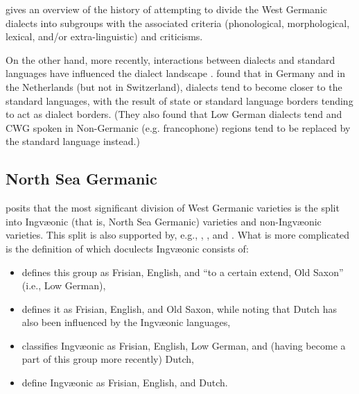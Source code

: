 \documentclass[a4paper]{article}
\begin{document}
\citet[pp. 72-80]{nielsen1989germanic} gives an overview of the history of attempting to divide the West Germanic dialects into subgroups with the associated criteria (phonological, morphological, lexical, and/or extra-linguistic) and criticisms.

On the other hand, more recently, %
interactions between dialects and standard languages
have influenced the dialect landscape
\citep{coetsem1992interaction}.
\citet{kremer1990einfuehrung} found that in Germany and in the Netherlands
(but not in Switzerland), dialects tend to become closer to the standard languages,
with the result of state or standard language borders tending to act as dialect borders.
(They also found that Low German dialects tend and CWG spoken in Non-Germanic (e.g. francophone) regions tend to be replaced by the standard language instead.)

\subsection{North Sea Germanic}

\citet{stiles2013pan-west} posits that
the most significant division of West Germanic varieties is
the split into Ingv\ae{}onic (that is, North Sea Germanic) varieties
and non-Ingv\ae{}onic varieties.
This split is also supported by, e.g., \citet[p. 7]{harbert2007germanic}, \citet[pp. 117--123]{sonderegger1979grundzuege}, and \cite{auwera2017germanic}.
What is more complicated is the definition of which doculects Ingv\ae{}onic consists of:
\begin{itemize}
\item 
\citet{stiles2013pan-west} defines this group
as Frisian, English, and ``to a certain extend, Old Saxon'' (i.e., Low German),

\item
\citet[pp. 7, 17]{harbert2007germanic} defines it
as Frisian, English, and Old Saxon,
while noting that Dutch has also been influenced by the Ingv\ae{}onic languages,

\item
\citet[pp. 71, 117--123]{sonderegger1979grundzuege} classifies Ingv\ae{}onic
as Frisian, English, Low German, and (having become a part of this group more recently) Dutch, %

\item
{} define Ingv\ae{}onic as Frisian, English, and Dutch.
\end{itemize}
\end{document}
